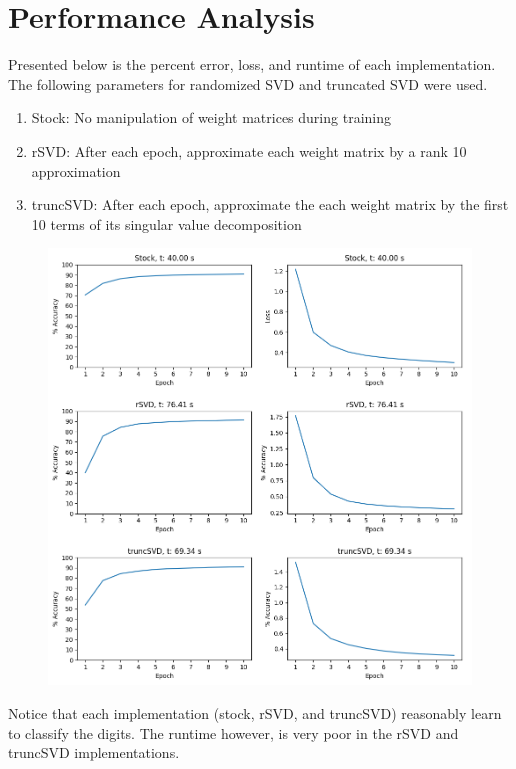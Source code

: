 \documentclass{article}
\begin{document}
\newpage
\section{Performance Analysis}

Presented below is the percent error, loss, and runtime of each implementation.
The following parameters for randomized SVD and truncated SVD were used.
\begin{enumerate}
	\item Stock: No manipulation of weight matrices during training
	\item rSVD: After each epoch, approximate each weight matrix by a rank 10 approximation
	\item truncSVD: After each epoch, approximate the each weight matrix by the first 10 terms of its singular value decomposition
\end{enumerate}
\begin{figure}[!htbp]
	\includegraphics[scale=0.7]{Figure_1.png}
	\centering
	\centering
	
	\label{tab:addlabel}%
\end{figure}%

Notice that each implementation (stock, rSVD, and truncSVD) reasonably learn to classify the digits.
The runtime however, is very poor in the rSVD and truncSVD implementations.
\end{document}
